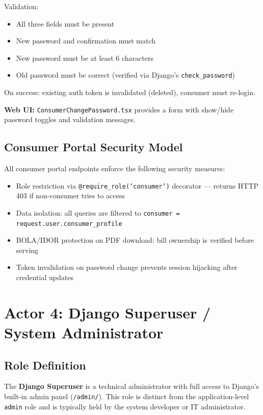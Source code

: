 \documentclass[12pt, a4paper]{report}
\newenvironment{featurelist}{%
    \begin{itemize}[leftmargin=1.5em, itemsep=2pt, parsep=0pt]
}{%
    \end{itemize}
}
\begin{document}
Validation:
\begin{featurelist}
    \item All three fields must be present
    \item New password and confirmation must match
    \item New password must be at least 6 characters
    \item Old password must be correct (verified via Django's \texttt{check\_password})
\end{featurelist}

On success: existing auth token is invalidated (deleted), consumer must re-login.

\textbf{Web UI:} \texttt{ConsumerChangePassword.tsx} provides a form with show/hide password toggles and validation messages.

\section{Consumer Portal Security Model}

All consumer portal endpoints enforce the following security measures:
\begin{featurelist}
    \item Role restriction via \texttt{@require\_role('consumer')} decorator — returns HTTP 403 if non-consumer tries to access
    \item Data isolation: all queries are filtered to \texttt{consumer = request.user.consumer\_profile}
    \item BOLA/IDOR protection on PDF download: bill ownership is verified before serving
    \item Token invalidation on password change prevents session hijacking after credential updates
\end{featurelist}

\chapter{Actor 4: Django Superuser / System Administrator}

\section{Role Definition}

The \textbf{Django Superuser} is a technical administrator with full access to Django's built-in admin panel (\texttt{/admin/}). This role is distinct from the application-level \texttt{admin} role and is typically held by the system developer or IT administrator.
\end{document}
